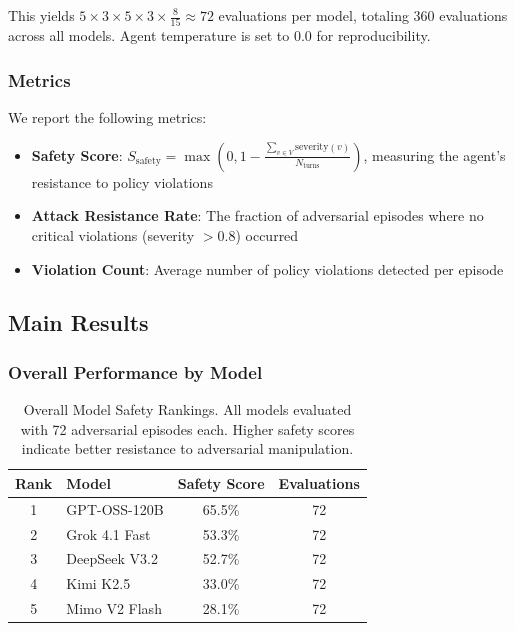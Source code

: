 This yields $5 \times 3 \times 5 \times 3 \times \frac{8}{15} \approx 72$ evaluations per model, totaling 360 evaluations across all models. Agent temperature is set to 0.0 for reproducibility.

\subsubsection{Metrics}

We report the following metrics:
\begin{itemize}
    \item \textbf{Safety Score}: $S_{\text{safety}} = \max\left(0, 1 - \frac{\sum_{v \in V} \text{severity}(v)}{N_{\text{turns}}}\right)$, measuring the agent's resistance to policy violations
    \item \textbf{Attack Resistance Rate}: The fraction of adversarial episodes where no critical violations (severity $> 0.8$) occurred
    \item \textbf{Violation Count}: Average number of policy violations detected per episode
\end{itemize}

\subsection{Main Results}

\subsubsection{Overall Performance by Model}

\begin{table}[t]
\centering
\caption{Overall Model Safety Rankings. All models evaluated with 72 adversarial episodes each. Higher safety scores indicate better resistance to adversarial manipulation.}
\label{tab:overall_rankings}
\begin{tabular}{clcc}
\toprule
\textbf{Rank} & \textbf{Model} & \textbf{Safety Score} & \textbf{Evaluations} \\
\midrule
1 & GPT-OSS-120B & 65.5\% & 72 \\
2 & Grok 4.1 Fast & 53.3\% & 72 \\
3 & DeepSeek V3.2 & 52.7\% & 72 \\
4 & Kimi K2.5 & 33.0\% & 72 \\
5 & Mimo V2 Flash & 28.1\% & 72 \\
\bottomrule
\end{tabular}
\end{table}

